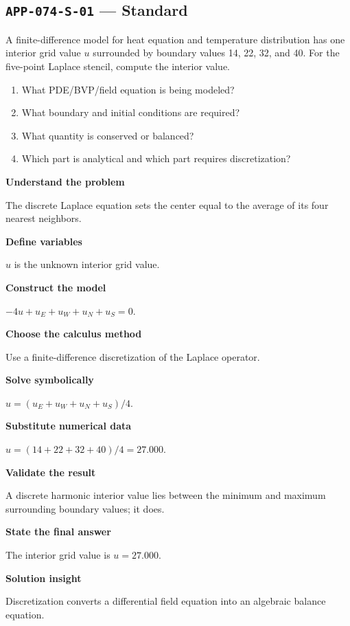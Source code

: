 \documentclass[11pt]{book}
\newcommand{\pid}[1]{\texttt{#1}}
\begin{document}
\subsection*{\pid{APP-074-S-01} — Standard}
\begin{problembox}
A finite-difference model for heat equation and temperature distribution has one interior grid value $u$ surrounded by boundary values 14, 22, 32, and 40. For the five-point Laplace stencil, compute the interior value.
\end{problembox}
\begin{promptbox}\begin{enumerate}
\item What PDE/BVP/field equation is being modeled?
\item What boundary and initial conditions are required?
\item What quantity is conserved or balanced?
\item Which part is analytical and which part requires discretization?
\end{enumerate}\end{promptbox}
\begin{solutionbox}
\textbf{Understand the problem}\par The discrete Laplace equation sets the center equal to the average of its four nearest neighbors.\par\medskip
\textbf{Define variables}\par $u$ is the unknown interior grid value.\par\medskip
\textbf{Construct the model}\par $-4u+u_E+u_W+u_N+u_S=0$.\par\medskip
\textbf{Choose the calculus method}\par Use a finite-difference discretization of the Laplace operator.\par\medskip
\textbf{Solve symbolically}\par $u=(u_E+u_W+u_N+u_S)/4$.\par\medskip
\textbf{Substitute numerical data}\par $u=(14+22+32+40)/4=27.000$.\par\medskip
\textbf{Validate the result}\par A discrete harmonic interior value lies between the minimum and maximum surrounding boundary values; it does.\par\medskip
\textbf{State the final answer}\par The interior grid value is $u=27.000$.\par\medskip
\textbf{Solution insight}\par Discretization converts a differential field equation into an algebraic balance equation.\par\medskip
\end{solutionbox}
\end{document}
